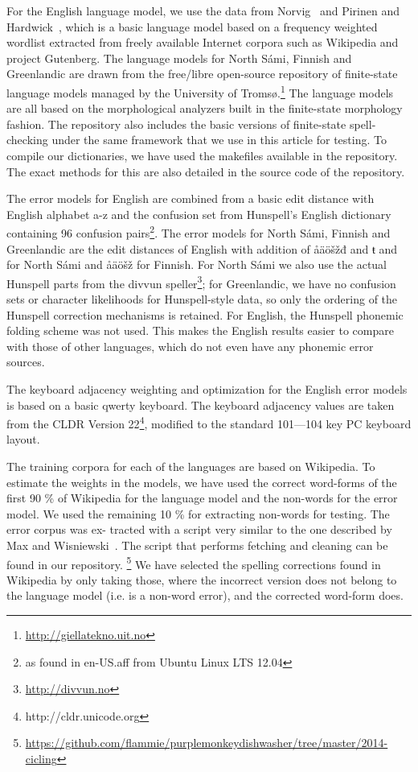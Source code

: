 \documentclass[postprint]{flammie}
\begin{document}
For the English language model, we use the data from Norvig~\cite{norvig} and
Pirinen and Hardwick~\cite{pirinen2012effects}, which is a basic language model
based on a frequency weighted wordlist extracted from freely available Internet
corpora such as Wikipedia and project Gutenberg. The language models for North
Sámi, Finnish and Greenlandic are drawn from the free/libre open-source
repository of finite-state language models managed by the University of
Tromsø.\footnote{\url{http://giellatekno.uit.no}} The language models are all
based on the morphological analyzers built in the finite-state
morphology~\cite{beesley2003finite} fashion. The repository also includes the
basic versions of finite-state spell-checking under the same framework that we
use in this article for testing. To compile our dictionaries, we have used the
makefiles available in the repository. The exact methods for this are also
detailed in the source code of the repository.

The error models for English are combined from a basic edit distance with
English alphabet a-z and the confusion set from Hunspell’s English dictionary
containing 96 confusion pairs\footnote{as found in en-US.aff from Ubuntu Linux
LTS 12.04}. The error models for North Sámi, Finnish and Greenlandic are the
edit distances of English with addition of åäöšžđ and { ŧ}
and for North Sámi and åäöšž for Finnish. For North Sámi we also use the actual
Hunspell parts from the divvun speller\footnote{\url{http://divvun.no}}; for
Greenlandic, we have no confusion sets or character likelihoods for
Hunspell-style data, so only the ordering of the Hunspell correction mechanisms
is retained. For English, the Hunspell phonemic folding scheme was not used.
This makes the English results easier to compare with those of other languages,
which do not even have any phonemic error sources.

The keyboard adjacency weighting and optimization for the English error models
is based on a basic qwerty keyboard. The keyboard adjacency values are taken
from the CLDR Version 22\footnote{http://cldr.unicode.org}, modified to the
standard 101—104 key PC keyboard layout.

The training corpora for each of the languages are based on Wikipedia. To
estimate the weights in the models, we have used the correct word-forms of the
first 90 \% of Wikipedia for the language model and the non-words for the error
model. We used the remaining 10 \% for extracting non-words for testing. The
error corpus was ex- tracted with a script very similar to the one described by
Max and Wisniewski~\cite{max2010mining}.  The script that performs fetching and
cleaning can be found in our repository.
\footnote{\url{https://github.com/flammie/purplemonkeydishwasher/tree/master/2014-cicling}}
We have selected the
spelling corrections found in Wikipedia by only taking those, where the
incorrect version does not belong to the language model (i.e. is a non-word
error), and the corrected word-form does.
\end{document}
